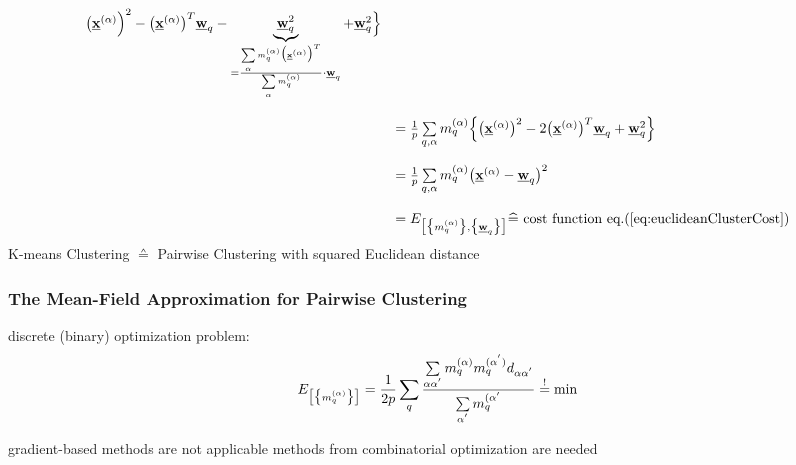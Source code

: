 \begin{equation}
\begin{array}{ll}
		\big( \underline{\mathbf{x}}^{(\alpha)} \Big)^2 - \big( \underline{\mathbf{x}}^{(\alpha)}
		\big)^T \underline{\mathbf{w}}_q - \underbrace{ \underline{\mathbf{w}}_q^2 }_{
			= \frac{ \sum\limits_{\alpha} m_q^{(\alpha)} \big(
				\underline{\mathbf{x}}^{(\alpha)} \big)^T }{
					\sum\limits_{\alpha} m_q^{(\alpha)}}
			\cdot \underline{\mathbf{w}}_q}
		+ \underline{\mathbf{w}}_q^2 \Big\} \\\\
	& = \frac{1}{p} \sum\limits_{q, \alpha} m_q^{(\alpha)} \Big\{ 
		\big( \underline{\mathbf{x}}^{(\alpha)} \big)^2 - 2 \big( \underline{\mathbf{x}}^{(\alpha)}
		\big)^T \underline{\mathbf{w}}_q + \underline{\mathbf{w}}_q^2 \Big\} \\\\
	& = \frac{1}{p} \sum\limits_{q, \alpha} m_q^{(\alpha)} \big( 
		\underline{\mathbf{x}}^{(\alpha)} - \underline{\mathbf{w}}_q \big)^2 \\\\
	& = E_{\big[ \big\{ m_q^{(\alpha)} \big\}, \big\{ \underline{\mathbf{w}}_q \big\} \big]} 
 \widehat{=} \text{ cost function eq.(\ref{eq:euclideanClusterCost})}
	\end{array}
\end{equation}
K-means Clustering $\corresponds$ Pairwise Clustering with squared Euclidean distance


\subsubsection{The Mean-Field Approximation for Pairwise Clustering}
discrete (binary) optimization problem:
\begin{equation}
	E_{ \big[ \big\{ m_q^{(\alpha)} \big\} \big] }
	= \frac{1}{2p} \sum\limits_q \frac{\sum\limits_{\alpha \alpha^{'}}
		m_q^{(\alpha)} m_q^{(\alpha^{'})} d_{\alpha \alpha^{'}}}{
			\sum\limits_{\alpha^{'}} m_q^{(\alpha^{'}}}
	\stackrel{\mathrm{!}}{=} \min
\end{equation}
\begin{itemize}
	\itR gradient-based methods are not applicable
	\itR methods from combinatorial optimization are needed
\end{itemize}

